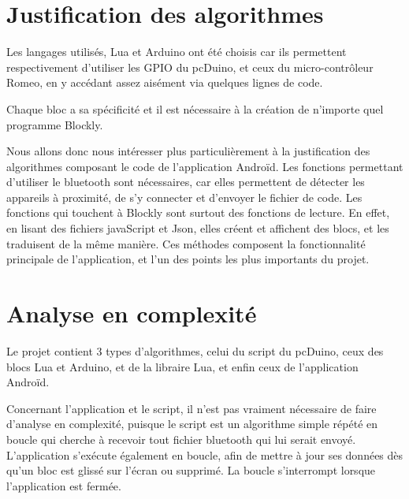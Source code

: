 \documentclass[12pt,francais]{report}
\begin{document}
\section*{Justification des algorithmes}

Les langages utilisés, Lua et Arduino ont été choisis car ils permettent respectivement d'utiliser les GPIO du pcDuino, et ceux du micro-contrôleur Romeo, en y accédant assez aisément via quelques lignes de code.

Chaque bloc a sa spécificité et il est nécessaire à la création de n'importe quel programme Blockly.

\bigskip
Nous allons donc nous intéresser plus particulièrement à la justification des algorithmes composant le code de l'application Androïd.
Les fonctions permettant d'utiliser le bluetooth sont nécessaires, car elles permettent de détecter les appareils à proximité, de s'y connecter et d'envoyer le fichier de code. Les fonctions qui touchent à Blockly sont surtout des fonctions de lecture. En effet, en lisant des fichiers javaScript et Json, elles créent et affichent des blocs, et les traduisent de la même manière. Ces méthodes composent la fonctionnalité principale de l'application, et l'un des points les plus importants du projet.



\section*{Analyse en complexité}

Le projet contient 3 types d'algorithmes, celui du script du pcDuino, ceux des blocs Lua et Arduino, et de la libraire Lua, et enfin ceux de l'application Androïd.

Concernant l'application et le script, il n'est pas vraiment nécessaire de faire d'analyse en complexité, puisque le script est un algorithme simple répété en boucle qui cherche à recevoir tout fichier bluetooth qui lui serait envoyé. L'application s'exécute également en boucle, afin de mettre à jour ses données dès qu'un bloc est glissé sur l'écran ou supprimé. La boucle s'interrompt lorsque l'application est fermée.
\end{document}
